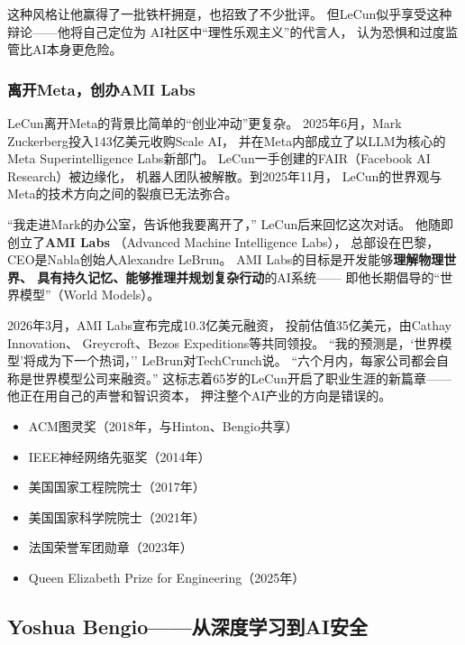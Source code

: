 这种风格让他赢得了一批铁杆拥趸，也招致了不少批评。
但LeCun似乎享受这种辩论——他将自己定位为
AI社区中``理性乐观主义''的代言人，
认为恐惧和过度监管比AI本身更危险。

\subsubsection{离开Meta，创办AMI Labs}
LeCun离开Meta的背景比简单的``创业冲动''更复杂。
2025年6月，Mark Zuckerberg投入143亿美元收购Scale AI，
并在Meta内部成立了以LLM为核心的
Meta Superintelligence Labs新部门。
LeCun一手创建的FAIR（Facebook AI Research）被边缘化，
机器人团队被解散。到2025年11月，
LeCun的世界观与Meta的技术方向之间的裂痕已无法弥合。

``我走进Mark的办公室，告诉他我要离开了，''
LeCun后来回忆这次对话。
他随即创立了\textbf{AMI Labs}
（Advanced Machine Intelligence Labs），
总部设在巴黎，CEO是Nabla创始人Alexandre LeBrun。
AMI Labs的目标是开发能够\textbf{理解物理世界、
具有持久记忆、能够推理并规划复杂行动}的AI系统——
即他长期倡导的``世界模型''（World Models）。

2026年3月，AMI Labs宣布完成10.3亿美元融资，
投前估值35亿美元，由Cathay Innovation、
Greycroft、Bezos Expeditions等共同领投。
``我的预测是，`世界模型'将成为下一个热词，''
LeBrun对TechCrunch说。
``六个月内，每家公司都会自称是世界模型公司来融资。''
这标志着65岁的LeCun开启了职业生涯的新篇章——
他正在用自己的声誉和智识资本，
押注整个AI产业的方向是错误的。

\begin{keybox}
\begin{itemize}[noitemsep]
  \item ACM图灵奖（2018年，与Hinton、Bengio共享）
  \item IEEE神经网络先驱奖（2014年）
  \item 美国国家工程院院士（2017年）
  \item 美国国家科学院院士（2021年）
  \item 法国荣誉军团勋章（2023年）
  \item Queen Elizabeth Prize for Engineering（2025年）
\end{itemize}
\end{keybox}

\bigskip

\subsection{Yoshua Bengio——从深度学习到AI安全}
\label{sec:bengio}

